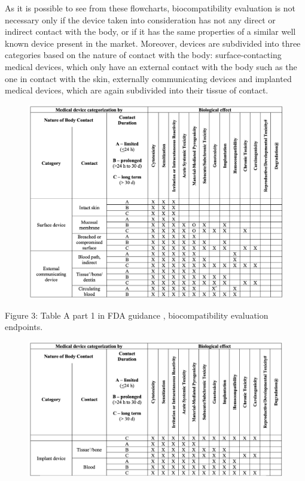 \documentclass{Configuration_Files/PoliMi3i_thesis}
\begin{document}
As it is possible to see from these flowcharts, biocompatibility evaluation is not necessary only if the device taken into consideration has not any direct or indirect contact with the body, or if it has the same properties of a similar well known device present in the market.
Moreover, devices are subdivided into three categories based on the nature of contact with the body: surface-contacting medical devices, which only have an external contact with the body such as the one in contact with the skin, externally communicating devices and implanted medical devices, which are again subdivided into their tissue of contact.

\begin{figure}[H]

	\includegraphics[scale=0.3]{tab1_fda.png}
	\centering
\end{figure}

Figure 3: Table A part 1 in FDA guidance \cite{healthUseInternationalStandard2023}, biocompatibility evaluation endpoints.

\begin{figure}[H]

	\includegraphics[scale=0.3]{tab2_fda.png}
	\centering
\end{figure}
\end{document}
